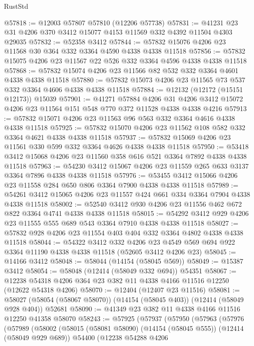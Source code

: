 \begin{lexlean}{RustStd}
\begin{coremodule}
{\begin{coremodule}
{{{{{{{{{{{{{{{{{{{{{{{{{{{{{{{{{{{{{{{{{{{{{{{{{{@57818 := @12003 @57807 @57810 (@12206 @57738)
@57831 := @41231 @23 @31 @4206 @370 @3412 @15077 @4153 @11569 @332 @4392 @11504 @4303 @29035
@57832 := @52358 @3412
@57844 := @57832 @15076 @4206 @23 @11568 @30 @364 @332 @3364 @4590 @4338 @4338 @11518
@57856 := @57832 @15075 @4206 @23 @11567 @22 @526 @332 @3364 @4596 @4338 @4338 @11518
@57868 := @57832 @15074 @4206 @23 @11566 @82 @532 @332 @3364 @4601 @4338 @4338 @11518
@57880 := @57832 @15073 @4206 @23 @11565 @73 @537 @332 @3364 @4606 @4338 @4338 @11518
@57884 := @12132 (@12172 (@15151 @12173)) @15039
@57901 := @41271
    @57884
    @4206
    @31
    @4206
    @3412
    @15072
    @4206
    @23
    @11564
    @151
    @548
    @770
    @372
    @11528
    @4338
    @4338
    @4216
@57913 := @57832 @15071 @4206 @23 @11563 @96 @563 @332 @3364 @4616 @4338 @4338 @11518
@57925 := @57832 @15070 @4206 @23 @11562 @108 @582 @332 @3364 @4621 @4338 @4338 @11518
@57937 := @57832 @15069 @4206 @23 @11561 @330 @599 @332 @3364 @4626 @4338 @4338 @11518
@57950 := @53418 @3412 @15068 @4206 @23 @11560 @358 @616 @521 @3364 @7892 @4338 @4338 @11518
@57963 := @54230 @3412 @15067 @4206 @23 @11559 @265 @633 @3137 @3364 @7896 @4338 @4338 @11518
@57976 := @53455 @3412 @15066 @4206 @23 @11558 @284 @650 @806 @3364 @7900 @4338 @4338 @11518
@57989 := @54261 @3412 @15065 @4206 @23 @11557 @424 @661 @334 @3364 @7904 @4338 @4338 @11518
@58002 := @52540 @3412 @930 @4206 @23 @11556 @462 @672 @822 @3364 @4741 @4338 @4338 @11518
@58015 := @54292 @3412 @929 @4206 @23 @11555 @555 @689 @543 @3364 @7910 @4338 @4338 @11518
@58027 := @57832 @928 @4206 @23 @11554 @403 @404 @332 @3364 @4802 @4338 @4338 @11518
@58044 := @54322
    @3412
    @332
    @4206
    @23
    @4549
    @569
    @694
    @922
    @3364
    @11190
    @4338
    @4338
    @11518
    (@52605 @3412 @4206 @23)
@58045 := @14166 @3412
@58048 := @58044 (@14154 (@58045 @569))
@58049 := @15387 @3412
@58054 := @58048 (@12414 (@58049 @332 @694)) @54351
@58067 := @12238 @54318 @4206 @364 @23 @382 @11 @4338 @4166 @11516 @12250 (@12622 @54318 @4206)
@58070 := @12404 (@12407 @23 @11516)
@58081 := @58027 (@58054 (@58067 @58070)) (@14154 (@58045 @403)) (@12414 (@58049 @928 @404)) @52681
@58090 := @41349 @23 @382 @11 @4338 @4166 @11516 @12250 @41358 @58070
@58243 := @57925
    (@57937
      (@57950
        (@57963
          (@57976
            (@57989
              (@58002
                (@58015
                  (@58081 @58090)
                  (@14154 (@58045 @555))
                  (@12414 (@58049 @929 @689))
                  @54400
                  (@12238
                    @54288
                    @4206
}}}}}}}}}}}}}}}}}}}}}}}}}}}}}}}}}}}}}}}}}}}}}}}}}}
\end{coremodule}}
\end{coremodule}
\end{lexlean}
